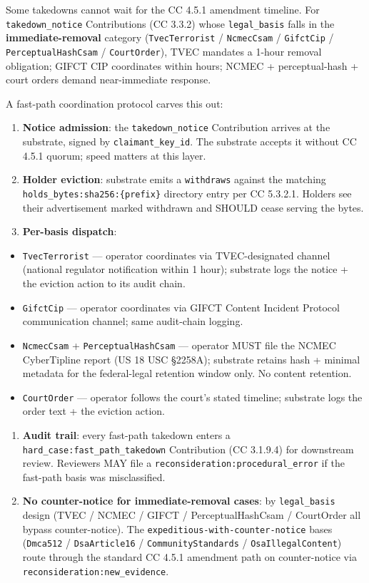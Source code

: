 \documentclass[11pt]{article}
\begin{document}
Some takedowns cannot wait for the CC 4.5.1 amendment timeline. For \texttt{takedown\_notice} Contributions (CC 3.3.2) whose \texttt{legal\_basis} falls in the \textbf{immediate-removal} category (\texttt{TvecTerrorist} / \texttt{NcmecCsam} / \texttt{GifctCip} / \texttt{PerceptualHashCsam} / \texttt{CourtOrder}), TVEC mandates a 1-hour removal obligation; GIFCT CIP coordinates within hours; NCMEC + perceptual-hash + court orders demand near-immediate response.


A fast-path coordination protocol carves this out:


\begin{enumerate}\setlength\itemsep{0pt}
\item \textbf{Notice admission}: the \texttt{takedown\_notice} Contribution arrives at the substrate, signed by \texttt{claimant\_key\_id}. The substrate accepts it without CC 4.5.1 quorum; speed matters at this layer.
\item \textbf{Holder eviction}: substrate emits a \texttt{withdraws} against the matching \texttt{holds\_bytes:sha256:\{prefix\}} directory entry per CC 5.3.2.1. Holders see their advertisement marked withdrawn and SHOULD cease serving the bytes.
\item \textbf{Per-basis dispatch}:
\end{enumerate}

\begin{itemize}\setlength\itemsep{0pt}
\item \texttt{TvecTerrorist} — operator coordinates via TVEC-designated channel (national regulator notification within 1 hour); substrate logs the notice + the eviction action to its audit chain.
\item \texttt{GifctCip} — operator coordinates via GIFCT Content Incident Protocol communication channel; same audit-chain logging.
\item \texttt{NcmecCsam} + \texttt{PerceptualHashCsam} — operator MUST file the NCMEC CyberTipline report (US 18 USC §2258A); substrate retains hash + minimal metadata for the federal-legal retention window only. No content retention.
\item \texttt{CourtOrder} — operator follows the court's stated timeline; substrate logs the order text + the eviction action.
\end{itemize}

\begin{enumerate}\setlength\itemsep{0pt}
\item \textbf{Audit trail}: every fast-path takedown enters a \texttt{hard\_case:fast\_path\_takedown} Contribution (CC 3.1.9.4) for downstream review. Reviewers MAY file a \texttt{reconsideration:procedural\_error} if the fast-path basis was misclassified.
\item \textbf{No counter-notice for immediate-removal cases}: by \texttt{legal\_basis} design (TVEC / NCMEC / GIFCT / PerceptualHashCsam / CourtOrder all bypass counter-notice). The \texttt{expeditious-with-counter-notice} bases (\texttt{Dmca512} / \texttt{DsaArticle16} / \texttt{CommunityStandards} / \texttt{OsaIllegalContent}) route through the standard CC 4.5.1 amendment path on counter-notice via \texttt{reconsideration:new\_evidence}.
\end{enumerate}
\end{document}
